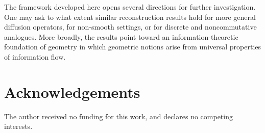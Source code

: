 \documentclass[11pt]{amsart}
\theoremstyle{definition}
\theoremstyle{remark}
\begin{document}
The framework developed here opens several directions for further investigation.
One may ask to what extent similar reconstruction results hold for more general
diffusion operators, for non-smooth settings, or for discrete and noncommutative
analogues.
More broadly, the results point toward an information-theoretic foundation of
geometry in which geometric notions arise from universal properties of
information flow.

\section*{Acknowledgements}
The author received no funding for this work, and declares no competing interests.




\end{document}

